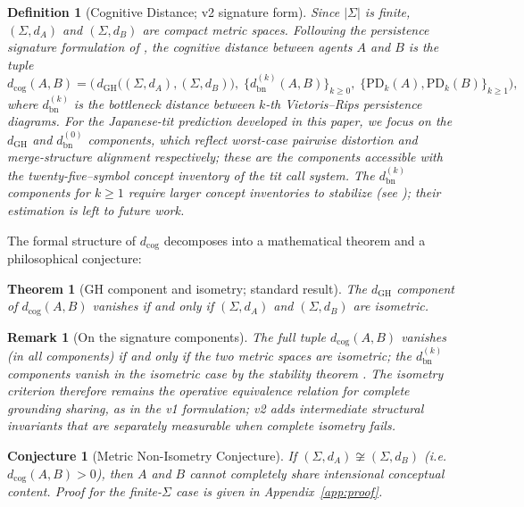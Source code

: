 \documentclass[12pt]{article}
\newtheorem{definition}{Definition}
\newtheorem{theorem}{Theorem}
\newtheorem{remark}{Remark}
\newtheorem{conjecture}{Conjecture}
\begin{document}
\begin{definition}[Cognitive Distance; v2 signature form]
\label{def:cogdist}
Since $|\Sigma|$ is finite, $(\Sigma, d_A)$ and $(\Sigma, d_B)$ are
compact metric spaces. Following the persistence signature
formulation of \cite[Def.~\ref{def:dcog-signature}]{minamoto2026topology},
the \emph{cognitive distance} between agents $A$ and $B$ is the tuple
\[
  d_\mathrm{cog}(A, B)
  = \Big(\,
      d_\mathrm{GH}\bigl((\Sigma, d_A), (\Sigma, d_B)\bigr),\;
      \{d_\mathrm{bn}^{(k)}(A, B)\}_{k \geq 0},\;
      \{\mathrm{PD}_k(A), \mathrm{PD}_k(B)\}_{k \geq 1}\Big),
\]
where $d_\mathrm{bn}^{(k)}$ is the bottleneck distance between
$k$-th Vietoris--Rips persistence diagrams. For the Japanese-tit
prediction developed in this paper, we focus on the $d_\mathrm{GH}$
and $d_\mathrm{bn}^{(0)}$ components, which reflect worst-case
pairwise distortion and merge-structure alignment respectively;
these are the components accessible with the twenty-five--symbol
concept inventory of the tit call system. The $d_\mathrm{bn}^{(k)}$
components for $k \geq 1$ require larger concept inventories to
stabilize (see \cite[App.~\ref{app:dcog-h1}]{minamoto2026topology});
their estimation is left to future work.
\end{definition}

The formal structure of $d_\mathrm{cog}$ decomposes into
a mathematical theorem and a philosophical conjecture:

\begin{theorem}[GH component and isometry; standard result]
\label{thm:gh}
The $d_\mathrm{GH}$ component of $d_\mathrm{cog}(A, B)$
vanishes if and only if $(\Sigma, d_A)$ and $(\Sigma, d_B)$ are
isometric.
\end{theorem}

\begin{remark}[On the signature components]
The full tuple $d_\mathrm{cog}(A, B)$ vanishes (in all components)
if and only if the two metric spaces are isometric; the
$d_\mathrm{bn}^{(k)}$ components vanish in the isometric case
by the stability theorem \cite{cohenSteiner2007}. The isometry
criterion therefore remains the operative equivalence relation for
complete grounding sharing, as in the v1 formulation; v2 adds
intermediate structural invariants that are separately measurable
when complete isometry fails.
\end{remark}

\begin{conjecture}[Metric Non-Isometry Conjecture]
\label{conj:mni}
If $(\Sigma, d_A) \not\cong (\Sigma, d_B)$
(i.e.\ $d_\mathrm{cog}(A,B) > 0$),
then $A$ and $B$ cannot completely share intensional conceptual content.
Proof for the finite-$\Sigma$ case is given in Appendix~\ref{app:proof}.
\end{conjecture}
\end{document}
